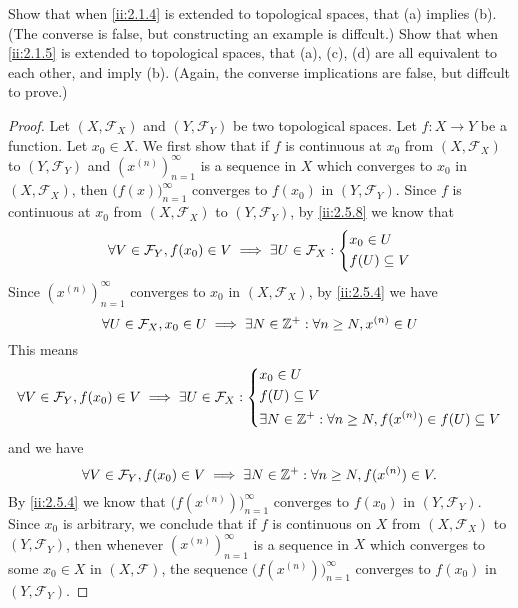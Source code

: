 \begin{ex}\label{ii:ex:2.5.16}
  Show that when \cref{ii:2.1.4} is extended to topological spaces, that (a) implies (b).
  (The converse is false, but constructing an example is diffcult.)
  Show that when \cref{ii:2.1.5} is extended to topological spaces, that (a), (c), (d) are all equivalent to each other, and imply (b).
  (Again, the converse implications are false, but diffcult to prove.)
\end{ex}

\begin{proof}
  Let \((X, \mathcal{F}_X)\) and \((Y, \mathcal{F}_Y)\) be two topological spaces.
  Let \(f : X \to Y\) be a function.
  Let \(x_0 \in X\).
  We first show that if \(f\) is continuous at \(x_0\) from \((X, \mathcal{F}_X)\) to \((Y, \mathcal{F}_Y)\) and \((x^{(n)})_{n = 1}^\infty\) is a sequence in \(X\) which converges to \(x_0\) in \((X, \mathcal{F}_X)\), then \(\big(f(x)\big)_{n = 1}^\infty\) converges to \(f(x_0)\) in \((Y, \mathcal{F}_Y)\).
  Since \(f\) is continuous at \(x_0\) from \((X, \mathcal{F}_X)\) to \((Y, \mathcal{F}_Y)\), by \cref{ii:2.5.8} we know that
  \[
    \forall V \in \mathcal{F}_Y, f(x_0) \in V \implies \exists U \in \mathcal{F}_X : \begin{dcases}
      x_0 \in U \\
      f(U) \subseteq V
    \end{dcases}
  \]
  Since \((x^{(n)})_{n = 1}^\infty\) converges to \(x_0\) in \((X, \mathcal{F}_X)\), by \cref{ii:2.5.4} we have
  \[
    \forall U \in \mathcal{F}_X, x_0 \in U \implies \exists N \in \mathbb{Z}^+ : \forall n \geq N, x^{(n)} \in U
  \]
  This means
  \[
    \forall V \in \mathcal{F}_Y, f(x_0) \in V \implies \exists U \in \mathcal{F}_X : \begin{dcases}
      x_0 \in U        \\
      f(U) \subseteq V \\
      \exists N \in \mathbb{Z}^+ : \forall n \geq N, f(x^{(n)}) \in f(U) \subseteq V
    \end{dcases}
  \]
  and we have
  \[
    \forall V \in \mathcal{F}_Y, f(x_0) \in V \implies \exists N \in \mathbb{Z}^+ : \forall n \geq N, f(x^{(n)}) \in V.
  \]
  By \cref{ii:2.5.4} we know that \(\big(f(x^{(n)})\big)_{n = 1}^\infty\) converges to \(f(x_0)\) in \((Y, \mathcal{F}_Y)\).
  Since \(x_0\) is arbitrary, we conclude that if \(f\) is continuous on \(X\) from \((X, \mathcal{F}_X)\) to \((Y, \mathcal{F}_Y)\), then whenever \((x^{(n)})_{n = 1}^\infty\) is a sequence in \(X\) which converges to some \(x_0 \in X\) in \((X, \mathcal{F})\), the sequence \(\big(f(x^{(n)})\big)_{n = 1}^\infty\) converges to \(f(x_0)\) in \((Y, \mathcal{F}_Y)\).


\end{proof}

